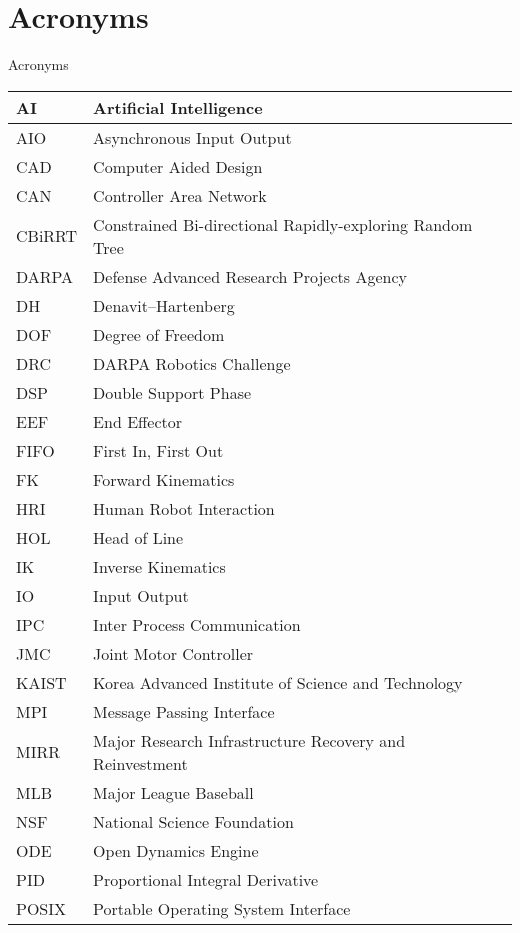 \chapter{Acronyms}
\Large
\begin{center}
Acronyms\\
\normalsize
\begin{longtable}{l | l}
\hline
AI & Artificial Intelligence\\
\hline
AIO & Asynchronous Input Output\\
\hline
CAD & Computer Aided Design\\
\hline
CAN & Controller Area Network \\
\hline
CBiRRT & Constrained Bi-directional Rapidly-exploring Random Tree\\
\hline
DARPA  &  Defense Advanced Research Projects Agency\\
\hline 
DH & Denavit–Hartenberg \\
\hline
DOF & Degree of Freedom \\
\hline
DRC  & DARPA Robotics Challenge \\
\hline
DSP & Double Support Phase\\
\hline
EEF  & End Effector\\
\hline
FIFO & First In, First Out\\
\hline
FK & Forward Kinematics\\
\hline
HRI & Human Robot Interaction\\
\hline
HOL & Head of Line\\
\hline
IK & Inverse Kinematics\\ 
\hline
IO & Input Output\\
\hline
IPC & Inter Process Communication \\
\hline
JMC & Joint Motor Controller\\
\hline
KAIST & Korea Advanced Institute of Science and Technology \\
\hline
MPI & Message Passing Interface\\
\hline
MIRR & Major Research Infrastructure Recovery and Reinvestment\\
\hline
MLB & Major League Baseball\\
\hline
NSF & National Science Foundation \\
\hline
ODE & Open Dynamics Engine\\
\hline
PID & Proportional Integral Derivative\\
\hline
POSIX & Portable Operating System Interface\\

\end{longtable}
\end{center}
